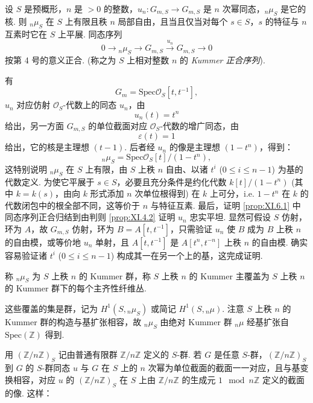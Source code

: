 \begin{proposition}\label{prop:XI.6.1}
设 $S$ 是预概形，$n$ 是 $> 0$ 的整数，$u_n \colon G_{m,S} \to G_{m,S}$ 是 $n$ 次幂同态，${}_n \mu_S$ 是它的核. 则 ${}_n \mu_S$ 在 $S$ 上有限且秩 $n$ 局部自由，且当且仅当对每个 $s \in S$，$s$ 的特征与 $n$ 互素时它在 $S$ 上平展. 同态序列
\[
0 \longrightarrow {}_n \mu_S \longrightarrow G_{m,S} \xrightarrow{u_n} G_{m,S} \longrightarrow 0
\]
按第 4 号的意义正合. (称之为 $S$ 上相对整数 $n$ 的 \emph{Kummer 正合序列}).
\end{proposition}

有
\[
G_m = \mathrm{Spec} \mathcal{O}_S[t, t^{-1}],
\]
$u_n$ 对应仿射 $\mathcal{O}_S$-代数上的同态 $u_n$，由
\[
u_n(t) = t^n
\]
给出，另一方面 $G_{m,S}$ 的单位截面对应 $\mathcal{O}_S$-代数的增广同态，由
\[
\varepsilon(t) = 1
\]
给出，它的核是主理想 $(t - 1)$. 后者经 $u_n$ 的像是主理想 $(1 - t^n)$，得到：
\[
{}_n \mu_S = \mathrm{Spec} \mathcal{O}_S[t]/(1 - t^n),
\]
这特别说明 ${}_n \mu_S$ 在 $S$ 上有限，由 $S$ 上秩 $n$ 自由、以诸 $t^i$ ($0 \leqslant i \leqslant n - 1$) 为基的代数定义. 为使它平展于 $s \in S$，必要且充分条件是约化代数 $k[t]/(1 - t^n)$ (其中 $k = k(s)$，由向 $k$ 形式添加 $n$ 次单位根得到) 在 $k$ 上可分，i.e. $1 - t^n$ 在 $k$ 的代数闭包中的根全部不同，这等价于 $n$ 与特征互素. 最后，证明 \ref{prop:XI.6.1} 中同态序列正合归结到由判则 \ref{prop:XI.4.2} 证明 $u_n$ 忠实平坦. 显然可假设 $S$ 仿射，环为 $A$，故 $G_{m,S}$ 仿射，环为 $B = A[t, t^{-1}]$，只需验证 $u_n$ 使 $B$ 成为 $B$ 上秩 $n$ 的自由模，或等价地 $u_n$ 单射，且 $A[t, t^{-1}]$ 是 $A[t^n, t^{-n}]$ 上秩 $n$ 的自由模. 确实容易验证诸 $t^i$ ($0 \leqslant i \leqslant n - 1$) 构成其一在另一个上的基，这完成证明.

\begin{definition}\label{def:XI.6.2}
称 ${}_n \mu_S$ 为 $S$ 上秩 $n$ 的 Kummer 群，称 $S$ 上秩 $n$ 的 Kummer 主覆盖为 $S$ 上秩 $n$ 的 Kummer 群下的每个主齐性纤维丛.
\end{definition}

这些覆盖的集是群，记为 $H^1(S, {}_n \mu_S)$ 或简记 $H^1(S, {}_n \mu)$. 注意 $S$ 上秩 $n$ 的 Kummer 群的构造与基扩张相容，故 ${}_n \mu_S$ 由绝对 Kummer 群 ${}_n \mu$ 经基扩张自 $\mathrm{Spec}(\mathbb{Z})$ 得到.

用 $(\mathbb{Z}/n\mathbb{Z})_S$ 记由普通有限群 $\mathbb{Z}/n\mathbb{Z}$ 定义的 $S$-群. 若 $G$ 是任意 $S$-群，$(\mathbb{Z}/n\mathbb{Z})_S$ 到 $G$ 的 $S$-群同态 $u$ 与 $G$ 在 $S$ 上的 $n$ 次幂为单位截面的截面一一对应，且与基变换相容，对应 $u$ 的 $(\mathbb{Z}/n\mathbb{Z})_S$ 在 $S$ 上由 $\mathbb{Z}/n\mathbb{Z}$ 的生成元 $1 \mod n\mathbb{Z}$ 定义的截面的像. 这样：

